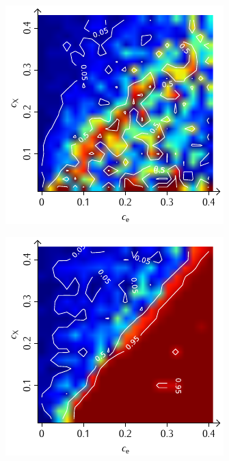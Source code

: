 \documentclass[a4paper, 10pt, twoside, openany]{book} %
\begin{document}
\begin{figure}
\begin{minipage}[t]{0.48\textwidth}
        \label{F_random_P}
    \end{minipage}
    \hfill
    \begin{minipage}[t]{0.48\textwidth}
        \includegraphics[width=\textwidth]{Abbildungen/Phasendiagramme/Konturen/F_penalty_random_P.pdf}
        \label{F_penalty_random_P}
    \end{minipage}
    \begin{minipage}[t]{0.48\textwidth}
        \includegraphics[width=\textwidth]{Abbildungen/Phasendiagramme/Konturen/F_individual_P.pdf}

\end{minipage}
\end{figure}
\end{document}
